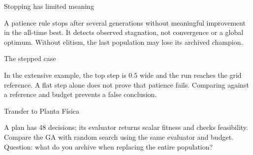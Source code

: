 \begin{frame}{Stopping has limited meaning}

A patience rule stops after several generations without meaningful improvement in the all-time best. It detects observed stagnation, not convergence or a global optimum. Without elitism, the last population may lose its archived champion.

\end{frame}

\begin{frame}{The stepped case}

In the extensive example, the top step is $0.5$ wide and the run reaches the grid reference. A flat step alone does not prove that patience fails. Comparing against a reference and budget prevents a false conclusion.

\end{frame}

\begin{frame}{Transfer to Planta Física}

A plan has 48 decisions; its evaluator returns scalar fitness and checks feasibility. Compare the GA with random search using the same evaluator and budget. Question: what do you archive when replacing the entire population?

\end{frame}


